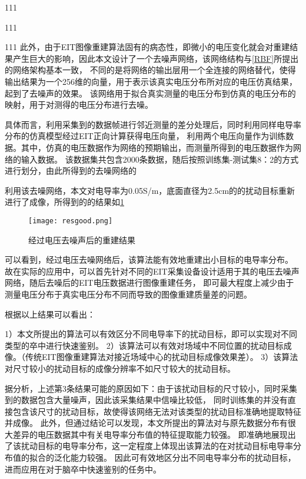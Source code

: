 \label{RBF}




111

111


111
此外，由于EIT图像重建算法固有的病态性，即微小的电压变化就会对重建结果产生巨大的影响，因此本文设计了一个去噪声网络，该网络结构与\cref{RBF}所提出的网络架构基本一致，
不同的是将网络的输出层用一个全连接的网络替代，使得输出结果为一个256维的向量，用于表示该真实电压分布所对应的电压仿真结果，起到了去噪声的效果。
该网络用于拟合真实测量的电压分布到仿真的电压分布的映射，用于对测得的电压分布进行去噪。

具体而言，利用采集到的数据帧进行邻近测量的差分处理后，同时利用同样电导率分布的仿真模型经过EIT正向计算获得电压向量，
利用两个电压向量作为训练数据。其中，仿真的电压数据作为网络的预期输出，而测量所得到的电压数据作为网络的输入数据。
该数据集共包含2000条数据，随后按照训练集-测试集8：2的方式进行划分，由此所得到的去噪网络的

利用该去噪网络，本文对电导率为0.05S/m，底面直径为2.5cm的的扰动目标重新进行了成像，所得到的的结果如\cref{figure:resgood}
\begin{figure}[h]
    \centering
    \texttt{[image: resgood.png]}
    \caption{经过电压去噪声后的重建结果}
    \label{figure:resgood}
\end{figure}

可以看到，经过电压去噪网络后，该算法能有效地重建出小目标的电导率分布。
故在实际的应用中，可以首先针对不同的EIT采集设备设计适用于其的电压去噪声网络，随后去噪后的EIT电压数据进行图像重建任务，
即可最大程度上减少由于测量电压分布于真实电压分布不同而导致的图像重建质量差的问题。





根据以上结果可以看出：

     1）本文所提出的算法可以有效区分不同电导率下的扰动目标，即可以实现对不同类型的卒中进行快速鉴别。
     2）该算法可以有效对场域中不同位置的扰动目标成像。（传统EIT图像重建算法对接近场域中心的扰动目标成像效果差）。
     3）该算法对尺寸较小的扰动目标的成像分辨率不如尺寸较大的扰动目标。


据分析，上述第3条结果可能的原因如下：由于该扰动目标的尺寸较小，同时采集到的数据包含大量噪声，因此该采集结果中信噪比较低，
同时训练集的并没有直接包含该尺寸的扰动目标，故使得该网络无法对该类型的扰动目标准确地提取特征并成像。
此外，但通过结论可以发现，本文所提出的算法对与原先数据分布有很大差异的电压数据其中有关电导率分布值的特征提取能力较强。
即准确地展现出了该扰动目标的电导率分布，这一定程度上体现出该算法的在对扰动目标电导率分布值的拟合的泛化能力较强。
因此可有效地区分出不同电导率分布的扰动目标，进而应用在对于脑卒中快速鉴别的任务中。




